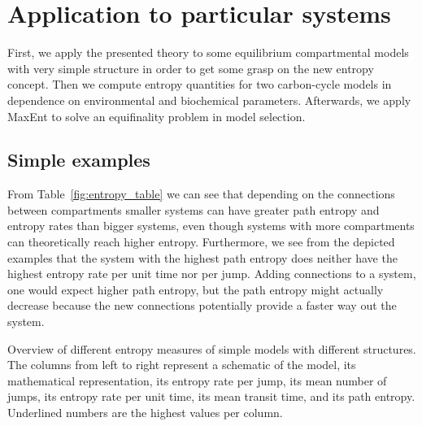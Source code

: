 \documentclass[smallextended]{svjour3}
\begin{document}
 
\section{Application to particular systems}
First, we apply the presented theory to some equilibrium compartmental models with very simple structure in order to get some grasp on the new entropy concept.
Then we compute entropy quantities for two carbon-cycle models in dependence on environmental and biochemical parameters.
Afterwards, we apply MaxEnt to solve an equifinality problem in model selection.

\subsection{Simple examples}
\label{sec:simple_examples}
From Table~\ref{fig:entropy_table} we can see that depending on the connections between compartments smaller systems can have greater path entropy and entropy rates than bigger systems, even though systems with more compartments can theoretically reach higher entropy.
Furthermore, we see from the depicted examples that the system with the highest path entropy does neither have the highest entropy rate per unit time nor per jump.
Adding connections to a system, one would expect higher path entropy, but the path entropy might actually decrease because the new connections potentially provide a faster way out the system.

\begin{table}[htbp]
  \centering
  \caption{Overview of different entropy measures of simple models with different structures.
  The columns from left to right represent a schematic of the model, its mathematical representation, its entropy rate per jump, its mean number of jumps, its entropy rate per unit time, its mean transit time, and its path entropy.
  Underlined numbers are the highest values per column.}
  \label{fig:entropy_table}
\end{table}
\end{document}
